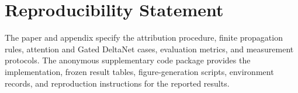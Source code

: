 \documentclass{article}
\begin{document}
\section*{Reproducibility Statement}
The paper and appendix specify the attribution procedure, finite propagation rules, attention and Gated DeltaNet cases, evaluation metrics, and measurement protocols. The anonymous supplementary code package provides the implementation, frozen result tables, figure-generation scripts, environment records, and reproduction instructions for the reported results.

\clearpage
\begingroup
\raggedright

\endgroup

\clearpage
\appendix

\end{document}
